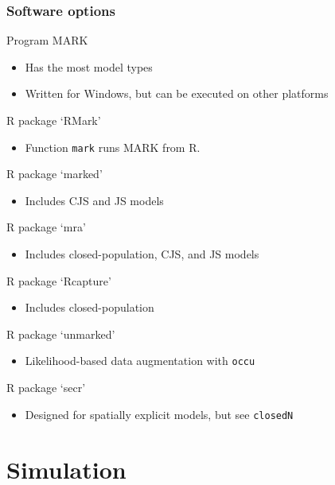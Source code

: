 \documentclass[color=usenames,dvipsnames]{beamer}\usepackage[]{graphicx}\usepackage[]{xcolor}
\newcommand{\inr}[1]{\colorbox{inlinecolor}{\texttt{#1}}}
\begin{document}
\begin{frame}
  \frametitle{Software options}
  \small
  Program MARK
  \begin{itemize}
  \footnotesize
    \item Has the most model types
    \item Written for Windows, but can be executed on other platforms  
  \end{itemize}
  R package `RMark'
  \begin{itemize}
  \footnotesize
    \item Function \inr{mark} runs MARK from R.
  \end{itemize}
  R package `marked'
  \begin{itemize}
  \footnotesize
    \item Includes CJS and JS models
  \end{itemize}
  R package `mra'
  \begin{itemize}
  \footnotesize
    \item Includes closed-population, CJS, and JS models
  \end{itemize}
  R package `Rcapture'
  \begin{itemize}
  \footnotesize
    \item Includes closed-population
  \end{itemize}
  R package `unmarked'
  \begin{itemize}
  \footnotesize
    \item Likelihood-based data augmentation with \inr{occu}
  \end{itemize}
  R package `secr'
  \begin{itemize}
  \footnotesize
    \item Designed for spatially explicit models, but see \inr{closedN}
  \end{itemize}
\end{frame}




\section{Simulation}



\end{document}
